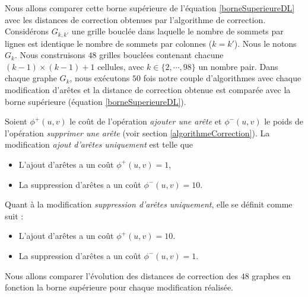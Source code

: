Nous allons comparer cette borne sup\'erieure de l'\'equation \ref{borneSuperieureDL} avec les distances de correction obtenues par l'algorithme de correction.
\newline
Consid\'erons $G_{k,k'}$ une grille boucl\'ee dans laquelle le nombre de sommets par lignes est identique le nombre de sommets par colonnes ($k = k'$). Nous le notons $G_k$.
\newline
Nous construisons $48$ grilles boucl\'ees  contenant chacune $(k -1)\times (k-1) +1$ cellules, avec $k \in \{2,\cdots,98\}$ un nombre pair.
Dans chaque graphe $G_k$, nous ex\'ecutons   $50$ fois notre couple d'algorithmes avec chaque modification d'ar\^etes et la distance de correction obtenue est compar\'ee avec la borne sup\'erieure (\'equation \ref{borneSuperieureDL}).
\newline

Soient $\phi^{+}(u,v)$ le co\^ut de l'op\'eration {\em ajouter une ar\^ete} et 
$\phi^{-}(u,v)$ le poids de l'op\'eration {\em supprimer une ar\^ete} (voir section \ref{algorithmeCorrection}). 
\newline
La modification {\em ajout d'ar\^etes uniquement} est telle que 
\begin{itemize}
	\item L'ajout d'ar\^etes a un co\^ut  $\phi^{+}(u,v) = 1$,
	\item La suppression d'ar\^etes a un co\^ut  $\phi^{-}(u,v) = 10$.
\end{itemize}
Quant \`a la modification {\em suppression d'ar\^etes uniquement}, elle se d\'efinit comme suit :
\begin{itemize}
	\item L'ajout d'ar\^etes a un co\^ut  $\phi^{+}(u,v) = 10$.
	\item La suppression d'ar\^etes a un co\^ut  $\phi^{-}(u,v) = 1$.
\end{itemize}
Nous allons comparer l'\'evolution des distances de correction des $48$ graphes en fonction la borne sup\'erieure pour chaque modification r\'ealis\'ee.

